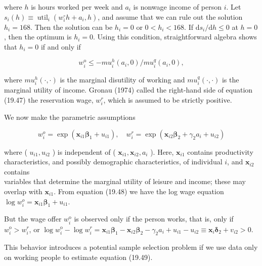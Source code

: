 \documentclass[10pt]{article}
\begin{document}
where $h$ is hours worked per week and $a_{i}$ is nonwage income of person $i$. Let $s_{i}(h) \equiv \operatorname{util}_{i}\left(w_{i}^{\circ} h+a_{i}, h\right)$, and assume that we can rule out the solution $h_{i}=168$. Then the solution can be $h_{i}=0$ or $0<h_{i}<168$. If $\mathrm{d} s_{i} / \mathrm{d} h \leq 0$ at $h=0$, then the optimum is $h_{i}=0$. Using this condition, straightforward algebra shows that $h_{i}=0$ if and only if


\begin{equation*}
w_{i}^{\mathrm{o}} \leq-m u_{i}^{h}\left(a_{i}, 0\right) / m u_{i}^{q}\left(a_{i}, 0\right), \tag{19.47}
\end{equation*}


where $m u_{i}^{h}(\cdot, \cdot)$ is the marginal disutility of working and $m u_{i}^{q}(\cdot, \cdot)$ is the marginal utility of income. Gronau (1974) called the right-hand side of equation (19.47) the reservation wage, $w_{i}^{r}$, which is assumed to be strictly positive.

We now make the parametric assumptions


\begin{equation*}
w_{i}^{o}=\exp \left(\mathbf{x}_{i 1} \boldsymbol{\beta}_{1}+u_{i 1}\right), \quad w_{i}^{r}=\exp \left(\mathbf{x}_{i 2} \boldsymbol{\beta}_{2}+\gamma_{2} a_{i}+u_{i 2}\right) \tag{19.48}
\end{equation*}


where ( $u_{i 1}, u_{i 2}$ ) is independent of ( $\mathbf{x}_{i 1}, \mathbf{x}_{i 2}, a_{i}$ ). Here, $\mathbf{x}_{i 1}$ contains productivity characteristics, and possibly demographic characteristics, of individual $i$, and $\mathbf{x}_{i 2}$ contains\\
variables that determine the marginal utility of leisure and income; these may overlap with $\mathbf{x}_{i 1}$. From equation (19.48) we have the log wage equation\\
$\log w_{i}^{o}=\mathbf{x}_{i 1} \boldsymbol{\beta}_{1}+u_{i 1}$.

But the wage offer $w_{i}^{\mathrm{o}}$ is observed only if the person works, that is, only if $w_{i}^{\mathrm{o}}>w_{i}^{r}$, or $\log w_{i}^{\mathrm{o}}-\log w_{i}^{r}=\mathbf{x}_{i 1} \boldsymbol{\beta}_{1}-\mathbf{x}_{i 2} \boldsymbol{\beta}_{2}-\gamma_{2} a_{i}+u_{i 1}-u_{i 2} \equiv \mathbf{x}_{i} \boldsymbol{\delta}_{2}+v_{i 2}>0$.

This behavior introduces a potential sample selection problem if we use data only on working people to estimate equation (19.49).
\end{document}
